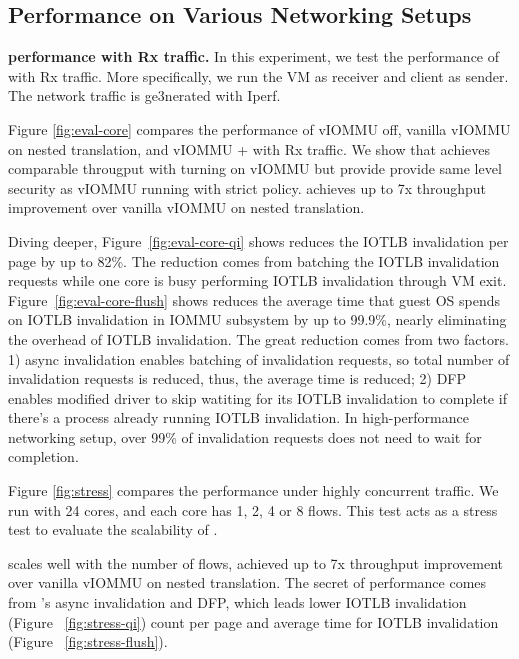 \subsection{Performance on Various Networking Setups}


\textbf{\brand performance with Rx traffic.} 
In this experiment, we test the performance of \brand with Rx traffic. 
More specifically, we run the VM as receiver and client as sender. The network traffic is ge3nerated with Iperf.

Figure \ref{fig:eval-core} compares the performance of vIOMMU off, 
vanilla vIOMMU on nested translation, and vIOMMU + \brand with Rx traffic.
We show that \brand achieves comparable througput with turning on vIOMMU 
but provide provide same level security as vIOMMU running with strict policy.
\brand achieves up to 7x throughput improvement over vanilla vIOMMU on nested translation.

Diving deeper, Figure~\ref{fig:eval-core-qi} shows \brand reduces the IOTLB invalidation per page by up to 82\%.
The reduction comes from batching the IOTLB invalidation requests 
    while one core is busy performing IOTLB invalidation through VM exit.
Figure~\ref{fig:eval-core-flush} shows \brand reduces the average time that guest OS spends on IOTLB invalidation in IOMMU subsystem by up to 99.9\%, 
    nearly eliminating the overhead of IOTLB invalidation. 
The great reduction comes from two factors.
    1) async invalidation enables batching of invalidation requests, so total number of invalidation requests is reduced, thus, the average time is reduced;
    2) DFP enables modified driver to skip watiting for its IOTLB invalidation to complete if there's a process already running IOTLB invalidation. 
In high-performance networking setup, over 99\% of invalidation requests does not need to wait for completion.




Figure \ref{fig:stress} compares the performance under highly concurrent traffic.
We run with 24 cores, and each core has 1, 2, 4 or 8 flows. 
This test acts as a stress test to evaluate the scalability of \brand.

\brand scales well with the number of flows,
    achieved up to 7x throughput improvement over vanilla vIOMMU on nested translation.
The secret of performance comes from \brand's async invalidation and DFP,
    which leads lower IOTLB invalidation (Figure ~\ref{fig:stress-qi}) 
    count per page and average time for IOTLB invalidation (Figure ~\ref{fig:stress-flush}).

